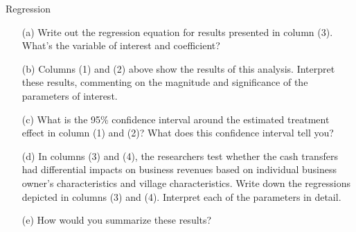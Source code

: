 \begin{homeworkProblem}{Regression}
    \begin{itemize}
        \item[(a)] Write out the regression equation for results presented in 
        column (3). What’s the variable of interest and coefficient?
        \item[(b)] Columns (1) and (2) above show the results of this analysis. 
        Interpret these results, commenting on the magnitude and significance 
        of the parameters of interest.
        \item[(c)] What is the 95\% confidence interval around the estimated 
        treatment effect in column (1) and (2)? What does this confidence 
        interval tell you?
        \item[(d)] In columns (3) and (4), the researchers test whether the 
        cash transfers had differential impacts on business revenues based on 
        individual business owner’s characteristics and village characteristics. 
        Write down the regressions depicted in columns (3) and (4). Interpret 
        each of the parameters in detail.
        \item[(e)] How would you summarize these results?
    \end{itemize}

\end{homeworkProblem}